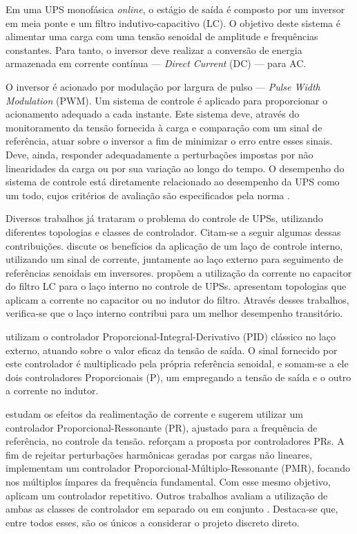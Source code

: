 \documentclass[repeatfields,oneside]{tcc}
\begin{document}
Em uma UPS monofásica \textit{online}, o estágio de saída é composto por um inversor em meia ponte e um filtro indutivo-capacitivo (LC).
O objetivo deste sistema é alimentar uma carga com uma tensão senoidal de amplitude e frequências constantes.
Para tanto, o inversor deve realizar a conversão de energia armazenada em corrente contínua --- \textit{Direct Current} (DC) --- para AC.

O inversor é acionado por modulação por largura de pulso --- \textit{Pulse Width Modulation} (PWM).
Um sistema de controle é aplicado para proporcionar o acionamento adequado a cada instante.
Este sistema deve, através do monitoramento da tensão fornecida à carga e comparação com um sinal de referência, atuar sobre o inversor a fim de minimizar o erro entre esses sinais.
Deve, ainda, responder adequadamente a perturbações impostas por não linearidades da carga ou por sua variação ao longo do tempo.
O desempenho do sistema de controle está diretamente relacionado ao desempenho da UPS como um todo, cujos critérios de avaliação são especificados pela norma \textcite{IEC62040-3:2011}.

Diversos trabalhos já trataram o problema do controle de UPSs, utilizando diferentes topologias e classes de controlador.
Citam-se a seguir algumas dessas contribuições.
%
\textcite{Finn1993} discute os benefícios da aplicação de um laço de controle interno, utilizando um sinal de corrente, juntamente ao laço externo para seguimento de referências senoidais em inversores.
\textcite{Abdel1996} propõem a utilização da corrente no capacitor do filtro LC para o laço interno no controle de UPSs.
\textcite{Ryan1997} apresentam topologias que aplicam a corrente no capacitor ou no indutor do filtro.
Através desses trabalhos, verifica-se que o laço interno contribui para um melhor desempenho transitório.

\textcite{Willmann2007} utilizam o controlador Proporcional-Integral-Derivativo (PID) clássico no laço externo, atuando sobre o valor eficaz da tensão de saída.
O sinal fornecido por este controlador é multiplicado pela própria referência senoidal, e somam-se a ele dois controladores Proporcionais (P), um empregando a tensão de saída e o outro a corrente no indutor.

\textcite{Loh2003} estudam os efeitos da realimentação de corrente e sugerem utilizar um controlador Proporcional-Ressonante (PR), ajustado para a frequência de referência, no controle da tensão.
\textcite{Teodorescu2006} reforçam a proposta por controladores PRs.
A fim de rejeitar perturbações harmônicas geradas por cargas não lineares, \textcite{Pereira2014, Keiel2017, Keiel2019, Bertoldi2019, Lorenzini2019} implementam um controlador Proporcional-Múltiplo-Ressonante (PMR), focando nos múltiplos ímpares da frequência fundamental.
Com esse mesmo objetivo, \textcite{Escobar2007} aplicam um controlador repetitivo.
Outros trabalhos avaliam a utilização de ambas as classes de controlador em separado \cite{Flores2012} ou em conjunto \cite{Lorenzini2013, Lorenzini2015}.
Destaca-se que, entre todos esses, \textcite{Keiel2017, Keiel2019} são os únicos a considerar o projeto discreto direto.
\end{document}
